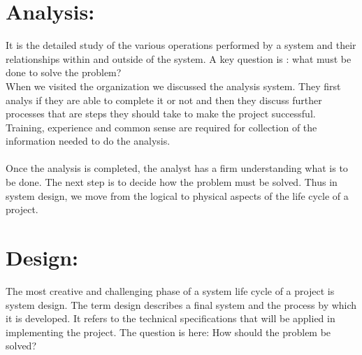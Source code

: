 \documentclass[a4paper,12pt]{report}
\begin{document}
\section{Analysis:}
 It is the detailed study of the various operations performed by a system and their relationships within and outside of the system. A key question is : what must be done to solve the problem?\\ 
 
 When we visited the organization we discussed the analysis system. They first analys if they are able to complete it or not and then they discuss further processes that are steps they should take to make the project successful. Training, experience and common sense are required for collection of the information needed to do the analysis.
 \\ \\
 Once the analysis is completed, the analyst has a firm understanding what is to be done. The next step is to decide how the problem must be solved. Thus in system design, we move from the logical to physical aspects of the life cycle of a project.\\
 \section{Design:}
 The most creative and challenging phase of a system life cycle of a project is system design. The term design describes a final system and the process by which it is developed. It refers to the technical specifications that will be applied in implementing the project. The question is here: How should the problem be solved?\\
 
\end{document}
